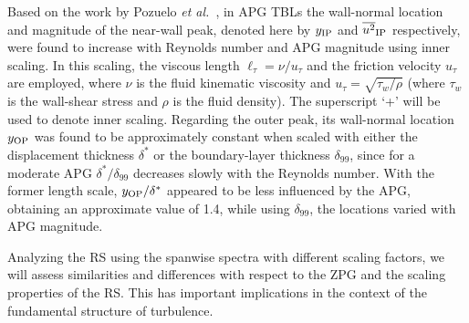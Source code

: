 Based on the work by Pozuelo {\it et al.}~\cite{Pozuelo_JFM_22}, in APG TBLs the wall-normal location and magnitude of the near-wall peak, denoted here by $y_{\rm IP}$ and $\overline{u^2}_{\rm IP}$ respectively, were found to increase with Reynolds number and APG magnitude using inner scaling. In this scaling, the viscous length $\ell_{\tau}=\nu/u_{\tau}$ and the friction velocity $u_{\tau}$ are employed, where $\nu$ is the fluid kinematic viscosity and $u_{\tau}=\sqrt{\tau_w/\rho}$ (where $\tau_w$ is the wall-shear stress and $\rho$ is the fluid density). The superscript `+'  will be used to denote inner scaling.
Regarding the outer peak, its wall-normal location $y_{\rm OP}$ was found to be approximately constant when scaled with either the displacement thickness $\delta^*$ or the boundary-layer thickness $\delta_{99}$, since for a moderate APG $\delta^*/\delta_{99}$ decreases slowly with the Reynolds number.
With the former length scale, $y_{\rm OP}/\delta^*$ appeared to be less influenced by the APG, obtaining an approximate value of 1.4, while using $\delta_{99}$, the locations varied with APG magnitude. 

Analyzing the RS using the spanwise spectra with different scaling factors, we will assess similarities and differences with respect to the ZPG and the scaling properties of the RS. This has important implications in the context of the fundamental structure of turbulence.


